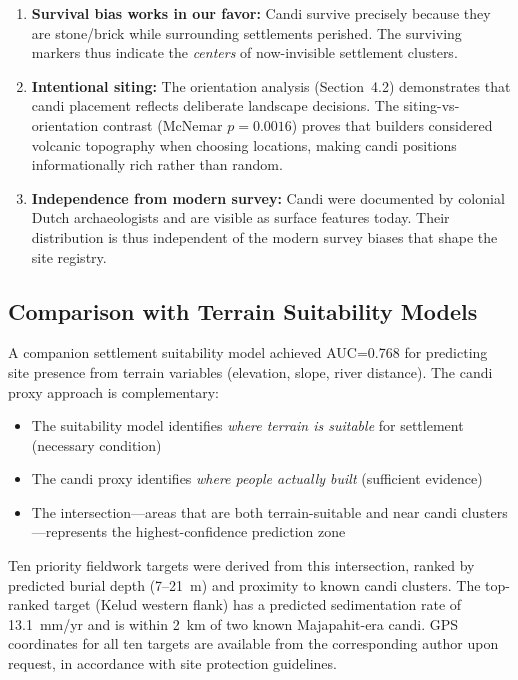 \documentclass[12pt,a4paper]{article}
\begin{document}
\begin{enumerate}
    \item \textbf{Survival bias works in our favor:} Candi survive precisely because they are stone/brick while surrounding settlements perished. The surviving markers thus indicate the \emph{centers} of now-invisible settlement clusters.
    \item \textbf{Intentional siting:} The orientation analysis (Section~4.2) demonstrates that candi placement reflects deliberate landscape decisions. The siting-vs-orientation contrast (McNemar $p=0.0016$) proves that builders considered volcanic topography when choosing locations, making candi positions informationally rich rather than random.
    \item \textbf{Independence from modern survey:} Candi were documented by colonial Dutch archaeologists and are visible as surface features today. Their distribution is thus independent of the modern survey biases that shape the site registry.
\end{enumerate}

\subsection{Comparison with Terrain Suitability Models}

A companion settlement suitability model achieved AUC=0.768 for predicting site presence from terrain variables (elevation, slope, river distance). The candi proxy approach is complementary:

\begin{itemize}
    \item The suitability model identifies \emph{where terrain is suitable} for settlement (necessary condition)
    \item The candi proxy identifies \emph{where people actually built} (sufficient evidence)
    \item The intersection---areas that are both terrain-suitable and near candi clusters---represents the highest-confidence prediction zone
\end{itemize}

Ten priority fieldwork targets were derived from this intersection, ranked by predicted burial depth (7--21~m) and proximity to known candi clusters. The top-ranked target (Kelud western flank) has a predicted sedimentation rate of 13.1~mm/yr and is within 2~km of two known Majapahit-era candi. GPS coordinates for all ten targets are available from the corresponding author upon request, in accordance with site protection guidelines.
\end{document}
